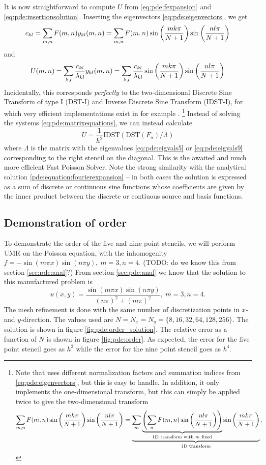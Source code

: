 It is now straightforward to compute $U$ from \ref{eq:pde:fexpansion} and \ref{eq:pde:insertionsolution}.
Inserting the eigenvectors \ref{eq:pde:eigenvectors}, we get
$$
c_{kl} = \sum_{m,n} F(m,n) y_{kl}(m,n) 
       = \sum_{m,n} F(m,n) \sin \left( \frac{mk\pi}{N+1} \right) \sin \left( \frac{nl\pi}{N+1} \right)
$$
and
$$
U(m,n) = \sum_{k,l} \frac{c_{kl}}{\lambda_{kl}} y_{kl}(m,n) 
       = \sum_{k,l} \frac{c_{kl}}{\lambda_{kl}} \sin \left( \frac{mk\pi}{N+1} \right) \sin \left( \frac{nl\pi}{N+1} \right)
$$
Incidentally, this corresponds \emph{perfectly} to the two-dimensional Discrete Sine Transform of type I (DST-I) and Inverse Discrete Sine Transform (IDST-I), for which very efficient implementations exist in for example \cite{scipy_dst}.
\footnote{
	Note that \cite{scipy_dst} uses different normalization factors and summation indices from \ref{eq:pde:eigenvectors}, but this is easy to handle.
	In addition, it only implements the one-dimensional transform, but this can simply be applied twice to give the two-dimensional transform
	$$
		\sum_{m,n} F(m,n) \sin \left( \frac{mk\pi}{N+1} \right) \sin \left( \frac{nl\pi}{N+1} \right) 
		= \underbrace{\sum_m \underbrace{\left(\sum_n F(m,n) \sin\left(\frac{nl\pi}{N+1}\right)\right)}_{\text{1D transform with $m$ fixed}} \sin\left(\frac{mk\pi}{N+1}\right)}_{\text{1D transform}}.
	$$
}
Instead of solving the systems \ref{eq:pde:matrixequations}, we can instead calculate
\begin{equation*}
U = \frac{1}{h^2} \text{IDST}(\text{DST}(F_n) / \Lambda)
\end{equation*}
where $\Lambda$ is the matrix with the eigenvalues \ref{eq:pde:eigvals5} or \ref{eq:pde:eigvals9} corresponding to the right stencil on the diagonal.
This is the awaited and much more efficient Fast Poisson Solver.
Note the strong similarity with the analytical solution \ref{pde:equation:fourierexpansion} -- in both cases the solution is expressed as a sum of discrete or continuous sine functions whose coefficients are given by the inner product between the discrete or contiuous source and basis functions.

\subsection{Demonstration of order}
To demonstrate the order of the five and nine point stencils, we will perform UMR on the Poisson equation, with the inhomogenity $f = -\sin(m \pi x)\sin(n \pi y), ~m=3, n=4$.
(TODO: do we know this from section \ref{sec:pde:anal}?)
From section \ref{sec:pde:anal} we know that the solution to this manufactured problem is
$$
u(x, y) =
\frac{
  \sin(m \pi x)\sin(n \pi y)
}{
  (n\pi)^2 + (m\pi)^2
}
, ~m=3, n=4.
$$
The mesh refinement is done with the same number of discretization points in $x$- and $y$-direction.
The values used are $N = N_x = N_y = \{8, 16, 32, 64, 128, 256\}$.
The solution is shown in figure \ref{fig:pde:order_solution}.
The relative error as a function of $N$ is shown in figure \ref{fig:pde:order}.
As expected, the error for the five point stencil goes as $h^2$ while the error for the nine point stencil goes as $h^4$.


